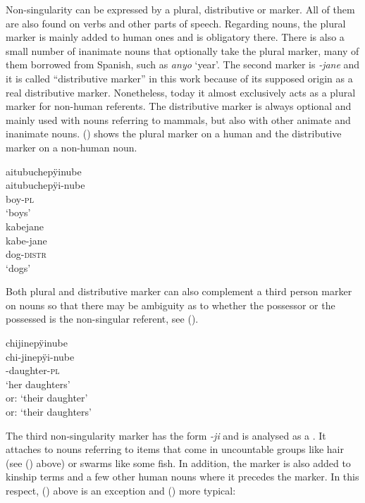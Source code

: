 Non-singularity can be expressed by a plural, distributive or  marker. All of them are also found on verbs and other parts of speech. Regarding nouns, the plural marker is mainly added to human ones and is obligatory there. There is also a small number of inanimate nouns that optionally take the plural marker, many of them borrowed from Spanish, such as \textit{anyo} ‘year’. The second marker is \textit{-jane} and it is called “distributive marker” in this work because of its supposed origin as a real distributive marker. Nonetheless, today it almost exclusively acts as a plural marker for non-human referents. The distributive marker is always optional and mainly used with nouns referring to mammals, but also with other animate and inanimate nouns. () shows the plural marker on a human and the distributive marker on a non-human noun.

\ea\label{ex:Sketch-PL}
  \ea
\begingl
\glpreamble aitubuchepÿinube\\
\gla aitubuchepÿi-nube\\
\glb boy-\textsc{pl}\\
\glft ‘boys’\\
\endgl
  \ex
\begingl
\glpreamble kabejane\\
\gla kabe-jane\\
\glb dog-\textsc{distr}\\
\glft ‘dogs’\\
\endgl
\z
\xe
{}


\hspace*{-1.1pt}Both plural and distributive marker can also complement a third person marker on nouns so that there may be ambiguity as to whether the possessor or the possessed is the non-singular referent, see ().

\ea\label{ex:Sketch-PL-Ambig}
\begingl
\glpreamble chijinepÿinube\\
\gla chi-jinepÿi-nube\\
-daughter-\textsc{pl}\\
\glft ‘her daughters’\\or: ‘their daughter’\\or: ‘their daughters’\\
\endgl
\xe

The third non-singularity marker has the form \textit{-ji} and is analysed as a . It attaches to nouns referring to items that come in uncountable groups like hair (see () above) or swarms like some fish. In addition, the marker is also added to kinship terms and a few other human nouns where it precedes the  marker. In this respect, () above is an exception and () more typical:

